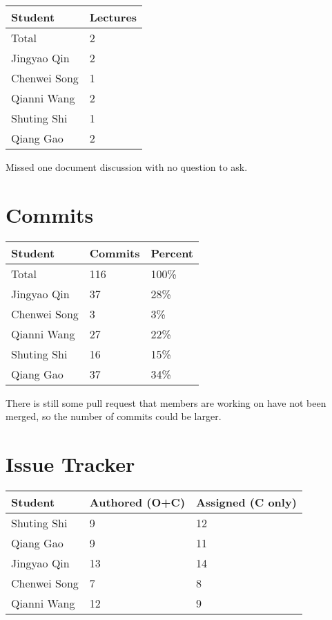 \documentclass{article}
\begin{document}
\begin{table}[H]
\centering
\begin{tabular}{ll}
\toprule
\textbf{Student} & \textbf{Lectures}\\
\midrule
Total & 2\\
Jingyao Qin  & 2\\
Chenwei Song  & 1\\
Qianni Wang  & 2\\
Shuting Shi  & 1\\
Qiang Gao  & 2\\
\bottomrule
\end{tabular}
\end{table}

Missed one document discussion with no question to ask. 

\section{Commits}


\begin{table}[H]
\centering
\begin{tabular}{lll}
\toprule
\textbf{Student} & \textbf{Commits} & \textbf{Percent}\\
\midrule
Total & 116 & 100\% \\
Jingyao Qin & 37 & 28\% \\
Chenwei Song & 3  & 3\% \\
Qianni Wang  & 27 & 22\% \\
Shuting Shi  & 16 & 15\% \\
Qiang Gao  & 37 & 34\% \\
\bottomrule
\end{tabular}
\end{table}

There is still some pull request that members are working on have not been merged, so the number of commits could be larger.

\section{Issue Tracker}


\begin{table}[H]
\centering
\begin{tabular}{lll}
\toprule
\textbf{Student} & \textbf{Authored (O+C)} & \textbf{Assigned (C only)}\\
\midrule
Shuting Shi & 9 & 12 \\
Qiang Gao & 9 & 11 \\
Jingyao Qin & 13 & 14 \\
Chenwei Song & 7 & 8 \\
Qianni Wang & 12 & 9 \\
\bottomrule
\end{tabular}
\end{table}
\end{document}
